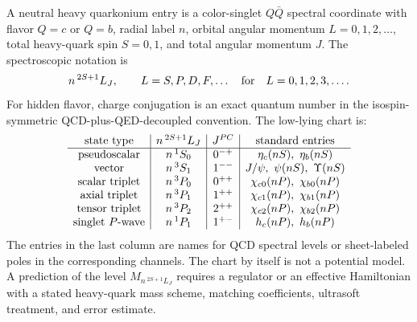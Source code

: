 \begin{definition}
\label{def:qcd-quarkonium-spectroscopy-chart}
A neutral heavy quarkonium entry is a color-singlet \(Q\bar Q\) spectral
coordinate with flavor \(Q=c\) or \(Q=b\), radial label \(n\), orbital angular
momentum \(L=0,1,2,\ldots\), total heavy-quark spin \(S=0,1\), and total
angular momentum \(J\).  The spectroscopic notation is
\begin{equation}
  n\,{}^{2S+1}L_J,
  \qquad
  L=S,P,D,F,\ldots\quad\hbox{for}\quad L=0,1,2,3,\ldots .
  \label{eq:qcd-quarkonium-spectroscopic-notation}
\end{equation}
For hidden flavor, charge conjugation is an exact quantum number in the
isospin-symmetric QCD-plus-QED-decoupled convention.  The low-lying chart is:
\[
\begin{array}{c|c|c|c}
\hbox{state type} & n\,{}^{2S+1}L_J & J^{PC} & \hbox{standard entries}\\
\hline
\hbox{pseudoscalar} & n\,{}^1S_0 & 0^{-+} & \eta_c(nS),\ \eta_b(nS)\\
\hbox{vector} & n\,{}^3S_1 & 1^{--} & J/\psi,\ \psi(nS),\ \Upsilon(nS)\\
\hbox{scalar triplet} & n\,{}^3P_0 & 0^{++} & \chi_{c0}(nP),\ \chi_{b0}(nP)\\
\hbox{axial triplet} & n\,{}^3P_1 & 1^{++} & \chi_{c1}(nP),\ \chi_{b1}(nP)\\
\hbox{tensor triplet} & n\,{}^3P_2 & 2^{++} & \chi_{c2}(nP),\ \chi_{b2}(nP)\\
\hbox{singlet \(P\)-wave} & n\,{}^1P_1 & 1^{+-} & h_c(nP),\ h_b(nP)
\end{array}
\]
The entries in the last column are names for QCD spectral levels or
sheet-labeled poles in the corresponding channels.  The chart by itself is
not a potential model.  A prediction of the level \(M_{n\,{}^{2S+1}L_J}\)
requires a regulator or an effective Hamiltonian with a stated heavy-quark
mass scheme, matching coefficients, ultrasoft treatment, and error estimate.
\end{definition}

